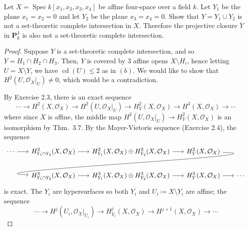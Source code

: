 \documentclass[10pt]{article}
\theoremstyle{definition}
\theoremstyle{remark}
\numberwithin{equation}{section}
\numberwithin{figure}{subsubsection}
\DeclareMathOperator{\Spec}{Spec}
\DeclareMathOperator{\cd}{cd}
\newcommand{\OO}{\mathcal{O}}
\begin{document}
\begin{problem}
  Let $X = \Spec k[x_1,x_2,x_3,x_4]$ be affine four-space over a field $k$. Let
  $Y_1$ be the plane $x_1 = x_2 = 0$ and let $Y_2$ be the plane $x_3 = x_4 = 0$.
  Show that $Y = Y_1 \cup Y_2$ is not a set-theoretic complete intersection in
  $X$. Therefore the projective closure $\overline{Y}$ in $\mathbf{P}_k^4$ is
  also not a set-theoretic complete intersection.
\end{problem}
\begin{proof}
  Suppose $Y$ is a set-theoretic complete intersection, and so $Y = H_1 \cap H_2
  \cap H_3$. Then, $Y$ is covered by $3$ affine opens $X \setminus H_i$, hence
  letting $U = X \setminus Y$, we have $\cd(U) \le 2$ as in $(b)$. We would like
  to show that $H^2(U,\OO_X\rvert_U) \ne 0$, which would be a contradiction.
  \par By Exercise 2.3, there is an exact sequence
  \begin{equation*}
    \cdots \longrightarrow H^2(X,\OO_X) \longrightarrow
    H^2(U,\OO_X\rvert_{U}) \longrightarrow H^2_{Y}(X,\OO_X)
    \longrightarrow H^3(X,\OO_X) \longrightarrow \cdots
  \end{equation*}
  where since $X$ is affine, the middle map $H^2(U,\OO_X\rvert_{U})
  \to H^2_{Y}(X,\OO_X)$ is an isomorphism by Thm.\ $3.7$. By the
  Mayer-Vietoris sequence (Exercise 2.4), the sequence
  \begin{equation*}
    \begin{tikzcd}[column sep=4ex]
      \cdots \rar & H^2_{Y_1 \cap Y_2}(X,\OO_X) \rar
      & H^2_{Y_1}(X,\OO_X) \oplus H^2_{Y_2}(X,\OO_X) \rar &
      H^2_{Y}(X,\OO_X)\arrow[overlay,out=-2,in=178,looseness=1]{dll}\\
      & H^3_{Y_1 \cap Y_2}(X,\OO_X) \rar &
      H^3_{Y_1}(X,\OO_X) \oplus H^3_{Y_2}(X,\OO_X) \rar &
      H^3_{Y}(X,\OO_X) \rar & \cdots
    \end{tikzcd}
  \end{equation*}
  is exact. The $Y_i$ are hypersurfaces so both $Y_i$ and $U_i \coloneqq X
  \setminus Y_i$ are affine; the sequence
  \begin{equation*}
    \cdots \longrightarrow
    H^j(U_i,\OO_X\rvert_{U_i}) \longrightarrow H^j_{Y_i}(X,\OO_X)
    \longrightarrow H^{j+1}(X,\OO_X) \longrightarrow \cdots
  \end{equation*}

\end{proof}
\end{document}
